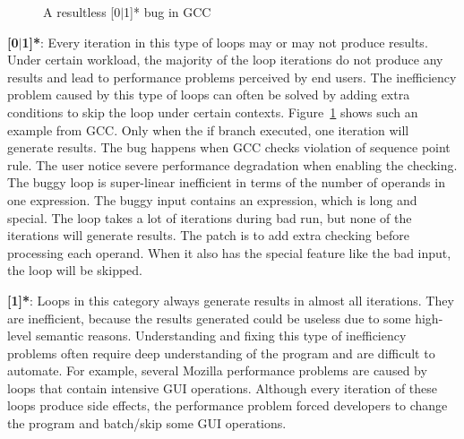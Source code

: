 


\begin{figure}
\caption{A resultless [0$|$1]* bug in GCC}
\label{fig:GCC46401}
\end{figure}



{\textbf{[0$|$1]*}}:
Every iteration in this type of loops may or may not produce results.
Under certain workload, the majority of the loop iterations do not produce
any results and lead to performance problems perceived by end users.
The inefficiency problem caused by this type of loops can often be solved
by adding extra conditions to skip the loop under certain contexts.
Figure~\ref{fig:GCC46401} shows such an example from GCC.
Only when the if branch executed,
one iteration will generate results. 
The bug happens when GCC checks violation of sequence point rule. 
The user notice severe performance degradation when enabling the checking. 
The buggy loop is super-linear inefficient in terms of the number of operands
in one expression. The buggy input contains an expression, which is long and special. 
The loop takes a lot of iterations during bad run, but none of the iterations will 
generate results. 
The patch is to add extra checking before processing each operand. When it also has
the special feature like the bad input, the loop will be skipped. 



{\textbf{[1]*}}:
Loops in this category always generate results in almost all iterations. 
They are inefficient, because the results generated could be useless due to
some high-level semantic reasons.
Understanding and fixing this type of inefficiency problems often require
deep understanding of the program and are difficult to automate.
For example, several Mozilla performance problems are caused by 
loops that contain intensive GUI operations.
Although every iteration of these loops produce side effects, 
the performance problem forced developers to change the program 
and batch/skip some GUI operations.


